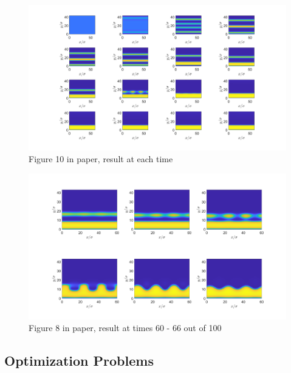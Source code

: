 \documentclass[11pt, a4paper]{article}
\theoremstyle{definition}
\begin{document}
\begin{figure}[h]
	\centering
	\includegraphics[scale=0.25]{Plotrhobar02.png}
	\caption{Figure 10 in paper, result at each time} 
	\label{F7}
\end{figure}
\begin{figure}[h]
	\centering
	\includegraphics[scale=0.25]{rhobar02Zoom60to66.png}
	\caption{Figure 8 in paper, result at times 60 - 66 out of 100} 
	\label{F8}
\end{figure}





\subsection{Optimization Problems}
\end{document}
